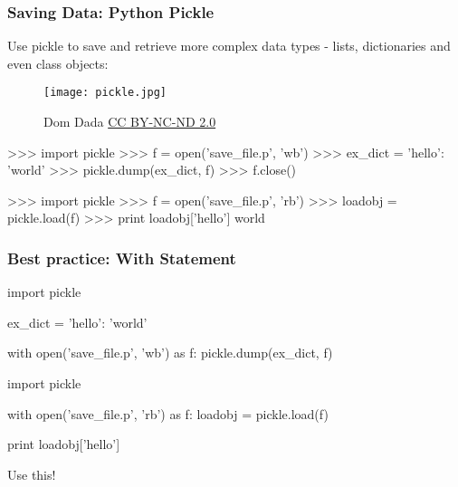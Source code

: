 \begin{frame}[fragile]
  \frametitle{Saving Data: Python Pickle}

  Use pickle to save and retrieve more complex data types - lists,
  dictionaries and even class objects:

  \bigskip\pause

  \begin{figure}
    \centering
    \texttt{[image: pickle.jpg]}
    \caption*{\scriptsize  \textcopyright Dom Dada \href{http://creativecommons.org/licenses/by-nc-nd/2.0/}{CC BY-NC-ND 2.0}}
  \end{figure}
  
  \vspace{-5.6cm}
  \begin{mlinepython}
    >>> import pickle 
    >>> f = open('save_file.p', 'wb')
    >>> ex_dict = {'hello': 'world'}
    >>> pickle.dump(ex_dict, f)
    >>> f.close()
  \end{mlinepython}

  \bigskip{}

  \begin{mlinepython}
    >>> import pickle 
    >>> f = open('save_file.p', 'rb')
    >>> loadobj = pickle.load(f)
    >>> print loadobj['hello']
    world
  \end{mlinepython}

\end{frame}


\begin{frame}[fragile]
  \frametitle{Best practice: With Statement}


  \begin{mlinepython}
    import pickle 

    ex_dict = {'hello': 'world'}

    with open('save_file.p', 'wb') as f:
        pickle.dump(ex_dict, f)
  \end{mlinepython}

  \bigskip \pause
  \vspace{0.2cm}

  \begin{mlinepython}
    import pickle 

    with open('save_file.p', 'rb') as f:
        loadobj = pickle.load(f)

    print loadobj['hello']
  \end{mlinepython}
  \vspace{0.15cm}
  \begin{arrowlist}
  \item Use this!
  \end{arrowlist}

\end{frame}





